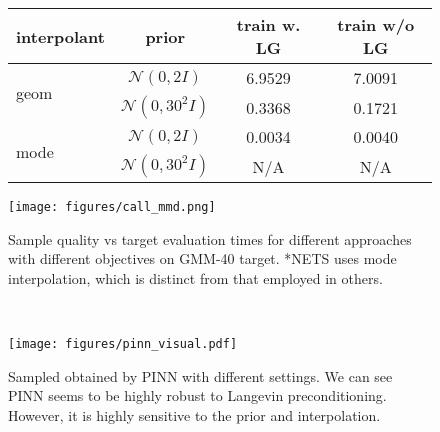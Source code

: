 \begin{figure}[t]
    \centering
    \begin{minipage}{0.43\textwidth}
        \centering
           \label{tab:pinn}
            \begin{adjustbox}{width=\linewidth}
            \begin{tabular}{@{}lccc@{}}
            \toprule
            interpolant & prior & train w. LG & train w/o LG \\ \midrule
            \multirow{2}{*}{geom} & $\mathcal{N}(0, 2I)$ & 6.9529 & 7.0091 \\
            & $\mathcal{N}(0, 30^2I)$ & 0.3368 & 0.1721 \\
            \multirow{2}{*}{mode} & $\mathcal{N}(0, 2I)$ & 0.0034  & 0.0040 \\
            & $\mathcal{N}(0, 30^2I)$ & N/A & N/A  \\ \bottomrule
            \end{tabular}
            \end{adjustbox}\vspace{0pt}
    \end{minipage}\hfill
    \begin{minipage}{0.55\textwidth}
        \centering
        \texttt{[image: figures/call\_mmd.png]}
        \caption{Sample quality vs target evaluation times for different approaches with different objectives on GMM-40 target.  *NETS uses mode interpolation, which is distinct from that employed in others. }\label{fig:energy_call_mmd}\vspace{0pt}
    \end{minipage}\\
     \begin{minipage}{\textwidth}
        \centering
        \texttt{[image: figures/pinn\_visual.pdf]}
        \caption{Sampled obtained by PINN with different settings.
   We can see PINN seems to be highly robust to Langevin preconditioning. 
   However, it is highly sensitive to the prior and interpolation. }\label{fig:pinn_sample}\vspace{0pt}
    \end{minipage}%
\end{figure}

